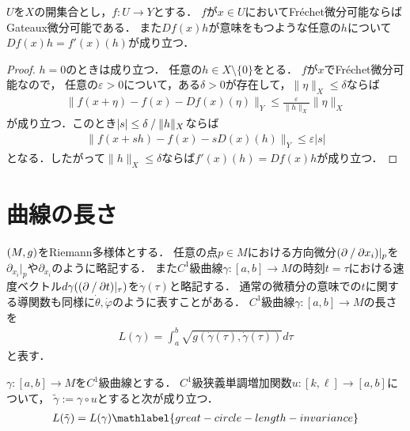 \documentclass{ltjsarticle}
\begin{document}
\begin{thmbox}
\begin{theorem}
\(U\)を\(X\)の開集合とし，\(f \colon U \to Y\)とする．
\(f\)が\(x \in U\)においてFréchet微分可能ならばGateaux微分可能である．
また\(Df(x)h\)が意味をもつような任意の\(h\)について\(Df(x)h = f'(x)(h)\)が成り立つ．
\end{theorem}
\end{thmbox}

\begin{proof}
\(h = 0\)のときは成り立つ．
任意の\(h \in X \setminus \{0\}\)をとる．
\(f\)が\(x\)でFréchet微分可能なので，
任意の\(\varepsilon > 0\)について，ある\(\delta > 0\)が存在して，\(\lVert \eta \rVert_X \leq \delta\)ならば
\begin{align*}
    \lVert f(x + \eta) - f(x) - Df(x) (\eta) \rVert_Y \leq \frac{\varepsilon}{\lVert h \rVert_X} \lVert \eta \rVert_X
\end{align*}
が成り立つ．このとき\(\lvert s \rvert \leq \delta\mathbin{/}\lVert h \rVert_X\)ならば
\begin{align}
    \lVert f(x + s h) - f(x) - s D(x)(h) \rVert_Y \leq \varepsilon \lvert s \rvert
\end{align}
となる．したがって\(\lVert h \rVert_X \leq \delta\)ならば\(f'(x)(h) = Df(x)h\)が成り立つ．
\end{proof}

\section{曲線の長さ}

\((M, g)\)をRiemann多様体とする．
任意の点\(p \in M\)における方向微分\((\partial\mathbin{/}\partial x_i)\rvert_p\)を\(\partial_{x_i}\rvert_{p}\)や\(\partial_{x_i}\)のように略記する．
また\(C^1\)級曲線\(\gamma \colon [a, b] \to M\)の時刻\(t = \tau\)における速度ベクトル\(\displaystyle d\gamma((\partial\mathbin{/}\partial t)\rvert_{\tau})\)を\(\dot{\gamma}(\tau)\)と略記する．
通常の微積分の意味での\(t\)に関する導関数も同様に\(\dot{\theta}, \dot{\varphi}\)のように表すことがある．
\(C^1\)級曲線\(\gamma \colon [a, b] \to M\)の長さを
\begin{align*}
    L(\gamma) = \int_{a}^{b} \sqrt{g(\dot{\gamma}(\tau), \dot{\gamma}(\tau))} d\tau
\end{align*}
と表す．

\begin{thmbox}
\begin{proposition}
\(\gamma \colon [a, b] \to M\)を\(C^1\)級曲線とする．
\(C^1\)級狭義単調増加関数\(u \colon [k, \ell] \to [a, b]\)について，
\(\tilde{\gamma} := \gamma \circ u\)とすると次が成り立つ．
\begin{align}
    L(\tilde{\gamma}) = L(\gamma) \mathlabel{great-circle-length-invariance}
\end{align}
\end{proposition}
\end{thmbox}
\end{document}
